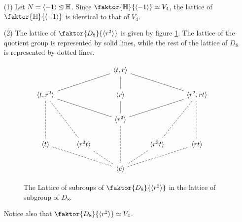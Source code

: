 \begin{example}\label{example_3.7}
  \begin{enumerate}
    \item[(1)] Let $N=\langle -1 \rangle \unlhd \mathbb{H}$. Since
      $\faktor{\Hb}{\langle -1 \rangle} \simeq V_4$, the lattice of
      $\faktor{\Hb}{\langle -1 \rangle}$ is identical to that of $V_4$.

    \item[(2)] The lattice of $\faktor{D_8}{\langle r^2 \rangle}$ is given by
      figure \ref{figure_3.4}. The lattice of the quotient group is
      represented by solid lines, while the rest of the lattice of $D_8$
      is represented by dotted lines.

      \begin{figure}[h]
        \[\begin{tikzcd}
  && {\langle t,r \rangle} \\
          {\langle t,r^2 \rangle} && {\langle r \rangle} && {\langle r^2,rt \rangle} \\
                                  && {\langle r^2 \rangle} \\
          {\langle t \rangle} & {\langle r^2t \rangle} && {\langle r^3t \rangle} & {\langle rt \rangle} \\
                              && {\langle e \rangle}
                              \arrow[no head, from=1-3, to=2-1]
                              \arrow[no head, from=2-1, to=3-3]
                              \arrow[no head, from=3-3, to=2-5]
                              \arrow[no head, from=2-5, to=1-3]
                              \arrow[no head, from=1-3, to=2-3]
                              \arrow[no head, from=2-3, to=3-3]
                              \arrow[dashed, no head, from=3-3, to=5-3]
                              \arrow[dashed, no head, from=2-1, to=4-1]
                              \arrow[dashed, no head, from=4-1, to=5-3]
                              \arrow[dashed, no head, from=5-3, to=4-5]
                              \arrow[dashed, no head, from=4-5, to=2-5]
                              \arrow[dashed, no head, from=2-5, to=4-4]
                              \arrow[dashed, no head, from=4-4, to=5-3]
                              \arrow[dashed, no head, from=5-3, to=4-2]
                              \arrow[dashed, no head, from=4-2, to=2-1]
        \end{tikzcd}\]
        \caption{The Lattice of subroups of $\faktor{D_8}{\vbrack{r^2}}$
        in the lattice of subgroup of $D_8$.}
        \label{figure_3.4}
      \end{figure}
      Notice also that $\faktor{D_8}{\langle r^2 \rangle} \simeq V_4$.
  \end{enumerate}
\end{example}
